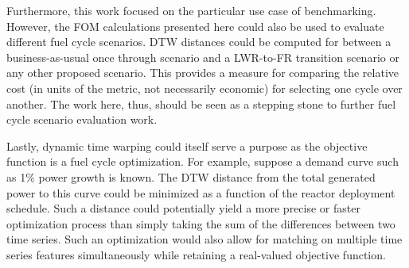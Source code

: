 Furthermore, this work focused on the particular use case of benchmarking.
However, the FOM calculations presented here could also be used to evaluate 
different fuel cycle scenarios. DTW distances could be computed for between
a business-as-usual once through scenario and a LWR-to-FR transition
scenario or any other proposed scenario. This provides a measure for 
comparing the relative cost (in units of the metric, not necessarily 
economic) for selecting one cycle over another. The work here, thus, 
should be seen as a stepping stone to further fuel cycle scenario evaluation
work.

Lastly, dynamic time warping could itself serve a purpose as the objective 
function is a fuel cycle optimization.  For example, suppose a demand curve 
such as 1\% power growth is known. The DTW distance from the total generated
power to this curve could be minimized as a function of the reactor 
deployment schedule. Such a distance could potentially yield a more 
precise or faster optimization process than simply taking the sum of 
the differences between two time series. Such an optimization would also allow
for matching on multiple time series features simultaneously while retaining
a real-valued objective function.

